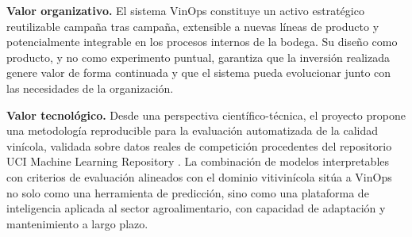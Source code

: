 \textbf{Valor organizativo.} El sistema VinOps constituye un activo estratégico reutilizable 
campaña tras campaña, extensible a nuevas líneas de producto y potencialmente integrable en 
los procesos internos de la bodega. Su diseño como producto, y no como experimento puntual, 
garantiza que la inversión realizada genere valor de forma continuada y que el sistema 
pueda evolucionar junto con las necesidades de la organización.

\textbf{Valor tecnológico.} Desde una perspectiva científico-técnica, el proyecto propone 
una metodología reproducible para la evaluación automatizada de la calidad vinícola, validada 
sobre datos reales de competición procedentes del repositorio UCI Machine Learning Repository 
\cite{UCIWine}. La combinación de modelos interpretables con criterios de evaluación 
alineados con el dominio vitivinícola sitúa a VinOps no solo como una herramienta de 
predicción, sino como una plataforma de inteligencia aplicada al sector agroalimentario, 
con capacidad de adaptación y mantenimiento a largo plazo.